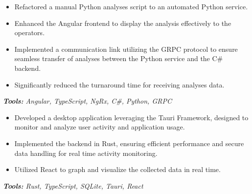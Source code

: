 \documentclass[10pt,letter]{altacv}
\begin{document}
\divider

\begin{itemize}
  \item Refactored a manual Python analyses script to an automated Python service.
  \item Enhanced the Angular frontend to display the analysis effectively to the operators.
  \item Implemented a communication link utilizing the GRPC protocol to ensure seamless transfer of analyses between the Python service and the C\# backend.
  \item Significantly reduced the turnaround time for receiving analyses data.
\end{itemize}
\textit{\textbf{Tools:} Angular, TypeScript, NgRx,  C\#, Python, GRPC}

\medskip



\begin{itemize}
  \item Developed a desktop application leveraging the Tauri Framework, designed to monitor and analyze user activity and application usage.
  \item Implemented the backend in Rust, ensuring efficient performance and secure data handling for real time activity monitoring.
  \item Utilized React to graph and visualize the collected data in real time.
\end{itemize}
\textit{\textbf{Tools:} Rust, TypeScript, SQLite, Tauri, React}

\divider
\end{document}
